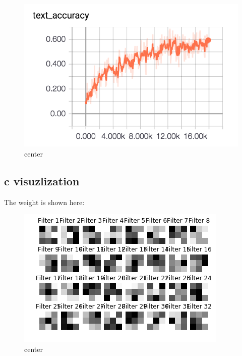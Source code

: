 \documentclass[12pt]{article}
\begin{document}
\begin{figure}[H]
  \caption{center}
  \centering
    \includegraphics[scale=1]{test.png}
\end{figure}

\subsection{c visuzlization}
The weight is shown here:
\begin{figure}[H]
  \caption{center}
  \centering
    \includegraphics[scale=1]{123.png}
\end{figure}
\end{document}

